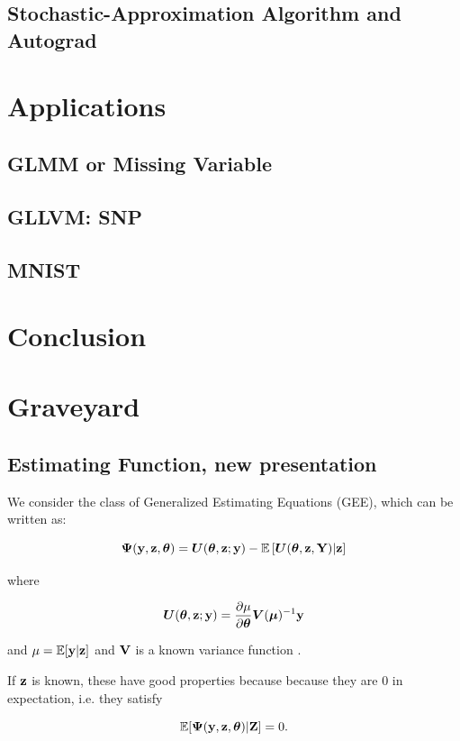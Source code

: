 \documentclass[twoside,11pt]{article}
\begin{document}
\subsection{Stochastic-Approximation Algorithm and Autograd}
\section{Applications}
\subsection{GLMM or Missing Variable}
\subsection{GLLVM: SNP}
\subsection{MNIST}
\section{Conclusion}
\newpage

\section{Graveyard}


\subsection{Estimating Function, new presentation}
We consider the class of Generalized Estimating Equations (GEE), which can be written as:

\begin{equation}
\bm\Psi({\bf y}, {\bf z}, {\bm{\theta}}) = \bm U({\bm{\theta}}, {\bf z}; {\bf y}) - \mathbb{E}\left[\bm U ({\bm{\theta}}, {\bf z}, {\bf Y})|{\bf z}\right]
\end{equation}

where

\begin{equation}
\bm U({\bm{\theta}}, {\bf z};{\bf y}) = \frac{\partial\mu}{\partial{\bm{\theta}}}\bm V(\bm\mu)^{-1} {\bf y}
\end{equation}

and $\mu = \mathbb{E}[{\bf y}|{\bf z}]$ and ${\bf V}$ is a known variance function . 


If ${\bf z}$ is known, these have good properties because because they are 0 in expectation, i.e. they satisfy

$$
\mathbb{E}[\bm\Psi({\bf y}, {\bf z}, {\bm{\theta}})|{\bf Z}] = 0.
$$
\end{document}
